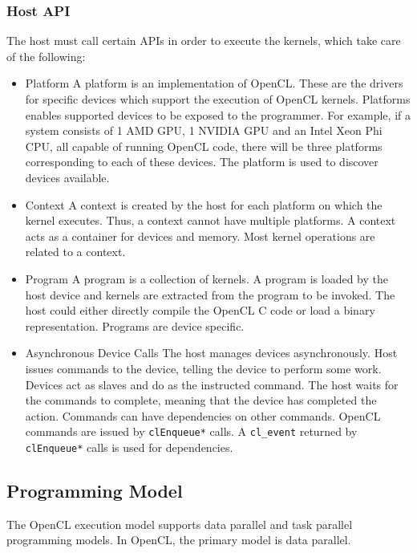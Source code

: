 \subsubsection{Host API}
The host must call certain APIs in order to execute the kernels, which take care of the following:
\begin{itemize}
\item Platform \newline
A platform is an implementation of OpenCL. These are the drivers for specific devices which support the execution of OpenCL kernels. Platforms enables supported devices to be exposed to the programmer. For example, if a system consists of 1 AMD GPU, 1 NVIDIA GPU and an Intel Xeon Phi CPU, all capable of running OpenCL code, there will be three platforms corresponding to each of these devices. The platform is used to discover devices available.
\item Context \newline
A context is created by the host for each platform on which the kernel executes. Thus, a context cannot have multiple platforms. A context acts as a container for devices and memory. Most kernel operations are related to a context.
\item Program \newline
A program is a collection of kernels. A program is loaded by the host device and kernels are extracted from the program to be invoked. The host could either directly compile the OpenCL C code or load a binary representation. Programs are device specific.
\item Asynchronous Device Calls \newline
The host manages devices asynchronously. Host issues commands to the device, telling the device to perform some work. Devices act as slaves and do as the instructed command. The host waits for the commands to complete, meaning that the device has completed the action. Commands can have dependencies on other commands. OpenCL commands are issued by \verb|clEnqueue*| calls. A \verb|cl_event| returned by \verb|clEnqueue*| calls is used for dependencies.

\end{itemize}

 \subsection{Programming Model}
The OpenCL execution model supports data parallel and task parallel programming models. In OpenCL, the primary model is data parallel. \newline

